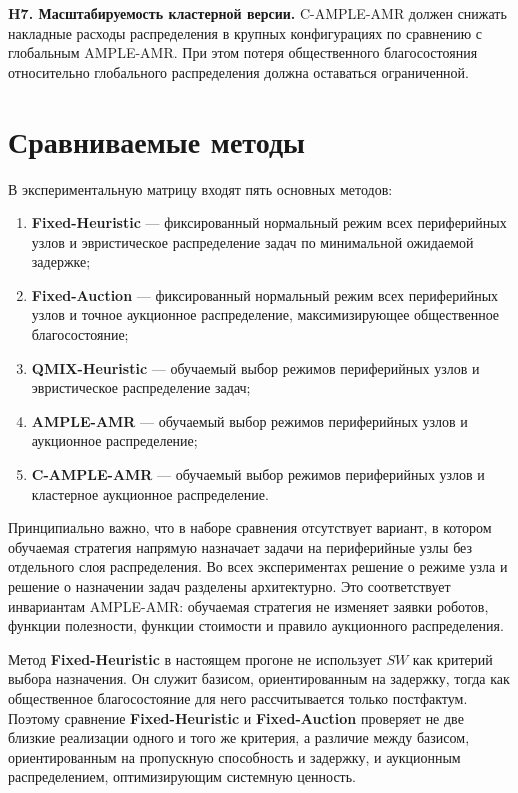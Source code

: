 \textbf{H7. Масштабируемость кластерной версии.} C-AMPLE-AMR должен снижать накладные расходы распределения в крупных конфигурациях по сравнению с глобальным AMPLE-AMR. При этом потеря общественного благосостояния относительно глобального распределения должна оставаться ограниченной.

\section{Сравниваемые методы}

В экспериментальную матрицу входят пять основных методов:
\begin{enumerate}
    \item \textbf{Fixed-Heuristic} --- фиксированный нормальный режим всех периферийных узлов и эвристическое распределение задач по минимальной ожидаемой задержке;
    \item \textbf{Fixed-Auction} --- фиксированный нормальный режим всех периферийных узлов и точное аукционное распределение, максимизирующее общественное благосостояние;
    \item \textbf{QMIX-Heuristic} --- обучаемый выбор режимов периферийных узлов и эвристическое распределение задач;
    \item \textbf{AMPLE-AMR} --- обучаемый выбор режимов периферийных узлов и аукционное распределение;
    \item \textbf{C-AMPLE-AMR} --- обучаемый выбор режимов периферийных узлов и кластерное аукционное распределение.
\end{enumerate}

Принципиально важно, что в наборе сравнения отсутствует вариант, в котором обучаемая стратегия напрямую назначает задачи на периферийные узлы без отдельного слоя распределения. Во всех экспериментах решение о режиме узла и решение о назначении задач разделены архитектурно. Это соответствует инвариантам AMPLE-AMR: обучаемая стратегия не изменяет заявки роботов, функции полезности, функции стоимости и правило аукционного распределения.

Метод \textbf{Fixed-Heuristic} в настоящем прогоне не использует $SW$ как критерий выбора назначения. Он служит базисом, ориентированным на задержку, тогда как общественное благосостояние для него рассчитывается только постфактум. Поэтому сравнение \textbf{Fixed-Heuristic} и \textbf{Fixed-Auction} проверяет не две близкие реализации одного и того же критерия, а различие между базисом, ориентированным на пропускную способность и задержку, и аукционным распределением, оптимизирующим системную ценность.

